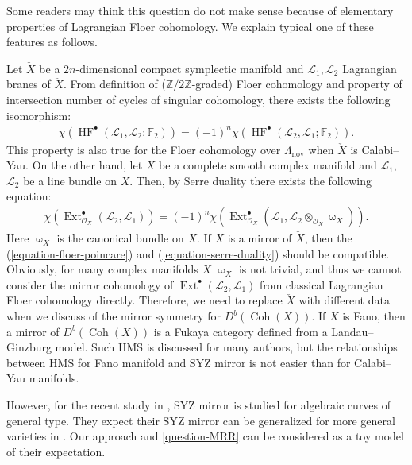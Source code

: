 \documentclass[a4paper,dvipdfmx,reqno,12pt]{amsart}
\theoremstyle{definition}
\newcommand{\mcal}[1]{\mathcal{#1}}%
\newcommand{\opn}[1]{\operatorname{#1}}
\numberwithin{equation}{section}
\begin{document}
Some readers may think this question do not make sense
because of elementary properties of 
Lagrangian Floer cohomology. 
We explain typical one of these features as follows.

Let $\check{X}$ be a $2n$-dimensional 
compact symplectic manifold and 
$\mathscr{L}_1,\mathscr{L}_2$
Lagrangian branes of $\check{X}$.
From definition of ($\mathbb{Z}/2\mathbb{Z}$-graded) 
Floer cohomology and 
property of intersection number of cycles of singular 
cohomology, there exists the
following isomorphism:
\begin{align}
\label{equation-floer-poincare}
\chi (\opn{HF}^{\bullet}(\mathscr{L}_1,\mathscr{L}_2;\mathbb{F}_2))
=(-1)^{n} 
\chi(\opn{HF}^{\bullet}(\mathscr{L}_2,\mathscr{L}_1;\mathbb{F}_2)).
\end{align}
This property is also true for 
the Floer cohomology over $\Lambda_{\opn{nov}}$ when 
$\check{X}$ is Calabi--Yau.
On the other hand, let $X$ be a complete smooth 
complex manifold and $\mathcal{L}_1$, $\mathcal{L}_2$ be a
line bundle on $X$. Then, by Serre duality there exists 
the following equation:
\begin{align}
\label{equation-serre-duality}
\chi(\opn{Ext}^{\bullet}_{\mcal{O}_X}
(\mcal{L}_2,\mcal{L}_1))
= (-1)^{n}\chi(\opn{Ext}^{\bullet}_{\mcal{O}_X}
(\mcal{L}_1,\mcal{L}_2\otimes_{\mathcal{O}_X} \upomega_X)).
\end{align}
Here $\upomega_X$ is the canonical bundle on $X$.
If $X$ is a mirror of $\check{X}$, then 
the (\ref{equation-floer-poincare}) and 
(\ref{equation-serre-duality}) should be compatible.
Obviously, for many complex manifolds $X$
$\upomega_X$ is not trivial, and thus we cannot
consider the mirror cohomology of 
$\opn{Ext}^{\bullet}(\mathcal{L}_2,\mathcal{L}_1)$
from classical Lagrangian Floer cohomology directly.
Therefore, we need to replace $\check{X}$ 
with different data when we discuss of the mirror 
symmetry for $D^{b}(\opn{Coh}(X))$. 
If $X$ is Fano, then a
mirror of $D^{b}(\opn{Coh}(X))$ is a Fukaya 
category defined from a Landau--Ginzburg model.
Such HMS is discussed for many authors, 
but the relationships between HMS for 
Fano manifold and SYZ mirror is not easier than 
for Calabi--Yau manifolds.

However, for the recent study 
in \cite{auroux2022lagrangian}, 
SYZ mirror is studied for algebraic curves 
of general type. 
They expect their SYZ mirror can be generalized for more
general varieties in \cite[{}]{auroux2022lagrangian}.
Our approach and \cref{question-MRR} can be considered as 
a toy model of their expectation. 
\end{document}
